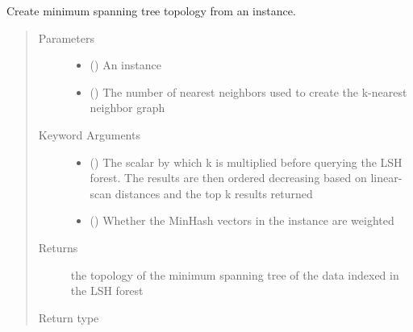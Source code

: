 \documentclass[letterpaper,10pt,english]{sphinxmanual}
\begin{document}

\begin{fulllineitems}
\label{\detokenize{documentation:tmap.mst_from_lsh_forest}}
Create minimum spanning tree topology from an {\hyperref[\detokenize{documentation:tmap.LSHForest}]{}} instance.
\begin{quote}\begin{description}
\item[{Parameters}] \leavevmode\begin{itemize}
\item {} 
 ({\hyperref[\detokenize{documentation:tmap.LSHForest}]{}}) \textendash{} An {\hyperref[\detokenize{documentation:tmap.LSHForest}]{}} instance

\item {} 
 () \textendash{} The number of nearest neighbors used to create the k-nearest neighbor graph

\end{itemize}

\item[{Keyword Arguments}] \leavevmode\begin{itemize}
\item {} 
 () \textendash{} The scalar by which k is multiplied before querying the LSH forest. The results are then ordered decreasing based on linear-scan distances and the top k results returned

\item {} 
 () \textendash{} Whether the MinHash vectors in the {\hyperref[\detokenize{documentation:tmap.LSHForest}]{}} instance are weighted

\end{itemize}

\item[{Returns}] \leavevmode
the topology of the minimum spanning tree of the data indexed in the LSH forest

\item[{Return type}] \leavevmode
{}

\end{description}\end{quote}

\end{fulllineitems}
\end{document}

